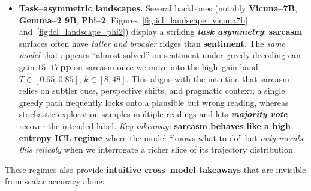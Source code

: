 \begin{itemize}[leftmargin=1.5em]
        backbones operate in a sharp
        \emph{\textbf{Goldilocks zone of exploration}} where
        \textbf{small decoding changes unlock large, emergent--looking
        ICL gains} without any gradient updates.
  \item \textbf{Task--asymmetric landscapes.}
        Several backbones (notably \textbf{Vicuna--7B},
        \textbf{Gemma--2 9B}, \textbf{Phi--2};
        Figures~\ref{fig:icl_landscape_vicuna7b}
        and~\ref{fig:icl_landscape_phi2}) display a striking
        \emph{\textbf{task asymmetry}}: \textbf{sarcasm} surfaces often
        have \emph{taller and broader} ridges than \textbf{sentiment}.
        The \emph{same model} that appears ``almost solved'' on
        sentiment under greedy decoding can gain
        \textbf{$15$--$17$\,pp} on sarcasm once we move into the
        high--gain band $T \in [0.65,0.85]$, $k \in [8,48]$. This
        aligns with the intuition that sarcasm relies on subtler cues,
        perspective shifts, and pragmatic context; a single greedy path
        frequently locks onto a plausible but wrong reading, whereas
        stochastic exploration samples multiple readings and lets
        \emph{\textbf{majority vote}} recover the intended label.
        \emph{Key takeaway:} \textbf{sarcasm behaves like a
        high--entropy ICL regime} where the model ``knows what to do''
        but \emph{only reveals this reliably} when we interrogate a
        richer slice of its trajectory distribution.
\end{itemize}

These regimes also provide \textbf{intuitive cross--model takeaways} that
are invisible from scalar accuracy alone:

